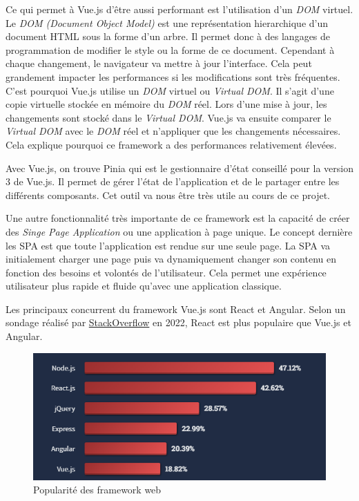 Ce qui permet à Vue.js d'être aussi performant est l'utilisation d'un \emph{DOM} virtuel. Le \emph{DOM (Document Object Model)} est une représentation hierarchique d'un document HTML sous la forme d'un arbre. Il permet donc à des langages de programmation de modifier le style ou la forme de ce document. Cependant à chaque changement, le navigateur va mettre à jour l'interface. Cela peut grandement impacter les performances si les modifications sont très fréquentes. C'est pourquoi Vue.js utilise un \emph{DOM} virtuel ou \emph{Virtual DOM}. Il s'agit d'une copie virtuelle stockée en mémoire du \emph{DOM} réel. Lors d'une mise à jour, les changements sont stocké dans le \emph{Virtual DOM}. Vue.js va ensuite comparer le \emph{Virtual DOM} avec le \emph{DOM} réel et n'appliquer que les changements nécessaires. Cela explique pourquoi ce framework a des performances relativement élevées.

Avec Vue.js, on trouve Pinia qui est le gestionnaire d'état conseillé pour la version 3 de Vue.js. Il permet de gérer l'état de l'application et de le partager entre les différents composants. Cet outil va nous être très utile au cours de ce projet.

Une autre fonctionnalité très importante de ce framework est la capacité de créer des \emph{Singe Page Application} ou une application à page unique. Le concept dernière les SPA est que toute l'application est rendue sur une seule page. La SPA va initialement charger une page puis va dynamiquement changer son contenu en fonction des besoins et volontés de l'utilisateur. Cela permet une expérience utilisateur plus rapide et fluide qu'avec une application classique.

Les principaux concurrent du framework Vue.js sont React et Angular. Selon un sondage réalisé par \href{https://survey.stackoverflow.co/2022/#most-popular-technologies-webframe}{StackOverflow} en 2022, React est plus populaire que Vue.js et Angular.
\begin{center}
    \begin{figure}[H]%
        \includegraphics[width=\textwidth]{./assets/figures/VueVSReactVSAngular.png}
        \caption{Popularité des framework web \label{VueVSReactVSAngular.png}}
    \end{figure}
\end{center}

